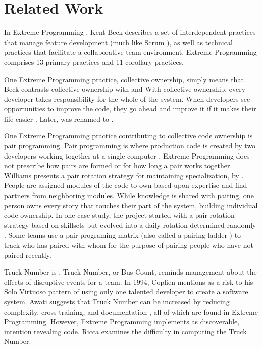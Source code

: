 \section{Related Work}
\label{RelatedWork}
In Extreme Programming \cite{BeckExtremeProgramming2004}, Kent Beck describes a set of interdependent practices that manage feature development (much like Scrum \cite{SchwaberScrum}), as well as technical practices that facilitate a collaborative team environment. Extreme Programming comprises 13 primary practices and 11 corollary practices. 

One Extreme Programming practice, collective ownership, simply means that  Beck contrasts collective ownership with  and  With collective ownership, every developer takes responsibility for the whole of the system. When developers see opportunities to improve the code, they go ahead and improve it if it makes their life easier \cite{BeckExtremeProgramming2000}. Later,  was renamed to  \cite{BeckExtremeProgramming2004}. 

One Extreme Programming practice contributing to collective code ownership is pair programming. Pair programming is where production code is created by two developers working together at a single computer \cite{BeckExtremeProgramming2004}. Extreme Programming does not prescribe how pairs are formed or for how long a pair works together. Williams presents a pair rotation strategy for maintaining specialization, by   \cite{Williams2002}. People are assigned modules of the code to own based upon expertise and find partners from neighboring modules. While knowledge is shared with pairing, one person owns every story that touches their part of the system, building individual code ownership. In one case study, the project started with a pair rotation strategy based on skillsets but evolved into a daily rotation determined randomly \cite{Vanhanen2007}. Some teams use a pair programing matrix \cite{AlaverdyanPairProgrammingMatrix} (also called a pairing ladder \cite{Davies2009AgileCoaching}) to track who has paired with whom for the purpose of pairing people who have not paired recently.

Truck Number is  \cite{WikiTruckNumber}. Truck Number, or Bus Count, reminds management about the effects of disruptive events for a team. In 1994, Coplien \cite{Coplien1994} mentions  as a risk to his Solo Virtuoso pattern of using only one talented developer to create a software system. Awati suggests that Truck Number can be increased by reducing complexity, cross-training, and documentation \cite{AwatiBusFactor}, all of which are found in Extreme Programming. However, Extreme Programming implements  as discoverable, intention revealing code. Ricca \cite{Ricca2011TruckFactor} examines the difficulty in computing the Truck Number. 

